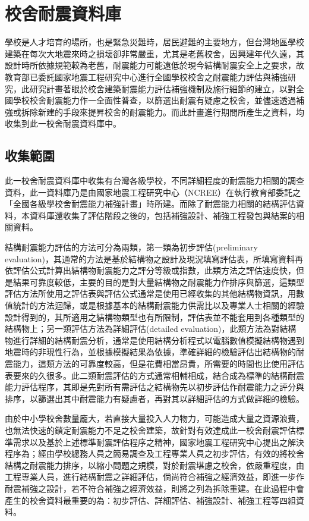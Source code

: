 \renewcommand\thetable{\arabic{chapter}-\arabic{table}}
\renewcommand{\theequation}{\arabic{chapter}-\arabic{equation}}
\chapter{校舍耐震資料庫}

學校是人才培育的場所，也是緊急災難時，居民避難的主要地方，但台灣地區學校建築在每次大地震來時之損壞卻非常嚴重，尤其是老舊校舍，因興建年代久遠，其設計時所依據規範較為老舊，耐震能力可能遠低於現今結構耐震安全上之要求，故教育部已委託國家地震工程研究中心進行全國學校校舍之耐震能力評估與補強研究，此研究計畫著眼於校舍建築耐震能力評估補強機制及施行細節的建立，以對全國學校校舍耐震能力作一全面性普查，以篩選出耐震有疑慮之校舍，並儘速透過補強或拆除新建的手段來提昇校舍的耐震能力。而此計畫進行期間所產生之資料，均收集到此一校舍耐震資料庫中。

\section{收集範圍}

此一校舍耐震資料庫中收集有台灣各級學校，不同詳細程度的耐震能力相關的調查資料，此一資料庫乃是由國家地震工程研究中心（NCREE）在執行教育部委託之「全國各級學校舍耐震能力補強計畫」時所建。而除了耐震能力相關的結構評估資料，本資料庫還收集了評估階段之後的，包括補強設計、補強工程發包與結案的相關資料。

結構耐震能力評估的方法可分為兩類，第一類為初步評估(preliminary evaluation)，其通常的方法是基於結構物之設計及現況填寫評估表，所填寫資料再依評估公式計算出結構物耐震能力之評分等級或指數，此類方法之評估速度快，但是結果可靠度較低，主要的目的是對大量結構物之耐震能力作排序與篩選，這類型評估方法所使用之評估表與評估公式通常是使用已經收集的其他結構物資訊，用數值統計的方法迴歸，或是根據基本的結構耐震能力供需比以及專業人士相關的經驗設計得到的，其所適用之結構物類型也有所限制，評估表並不能套用到各種類型的結構物上；另一類評估方法為詳細評估(detailed evaluation)，此類方法為對結構物進行詳細的結構耐震分析，通常是使用結構分析程式以電腦數值模擬結構物遇到地震時的非現性行為，並根據模擬結果為依據，準確詳細的檢驗評估出結構物的耐震能力，這類方法的可靠度較高，但是花費相當昂貴，所需要的時間也比使用評估表要來的久很多。此二類耐震評估的方式通常相輔相成，結合成為標準的結構耐震能力評估程序，其即是先對所有需評估之結構物先以初步評估作耐震能力之評分與排序，以篩選出其中耐震能力有疑慮者，再對其以詳細評估的方式做詳細的檢驗。

由於中小學校舍數量龐大，若直接大量投入人力物力，可能造成大量之資源浪費，也無法快速的鎖定耐震能力不足之校舍建築，故針對有效達成此一校舍耐震評估標準需求以及基於上述標準耐震評估程序之精神，國家地震工程研究中心提出之解決程序為；經由學校總務人員之簡易調查及工程專業人員之初步評估，有效的將校舍結構之耐震能力排序，以縮小問題之規模，對於耐震堪慮之校舍，依嚴重程度，由工程專業人員，進行結構耐震之詳細評估，倘尚符合補強之經濟效益，即進一步作耐震補強之設計，若不符合補強之經濟效益，則將之列為拆除重建。在此過程中會產生的校舍資料最重要的為：初步評估、詳細評估、補強設計、補強工程等四組資料。

